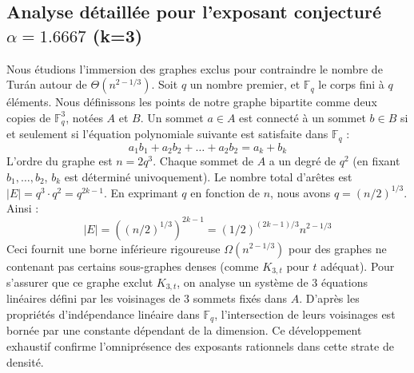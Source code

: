 \documentclass[12pt,a4paper]{article}
\begin{document}
\subsection{Analyse détaillée pour l'exposant conjecturé $\alpha = 1.6667$ (k=3)}
Nous étudions l'immersion des graphes exclus pour contraindre le nombre de Turán autour de $\Theta(n^{2 - 1/3})$.
Soit $q$ un nombre premier, et $\mathbb{F}_q$ le corps fini à $q$ éléments. Nous définissons les points de notre graphe bipartite comme deux copies de $\mathbb{F}_q^{3}$, notées $A$ et $B$.
Un sommet $a \in A$ est connecté à un sommet $b \in B$ si et seulement si l'équation polynomiale suivante est satisfaite dans $\mathbb{F}_q$ :
$$ a_1 b_1 + a_2 b_2 + \dots + a_2 b_2 = a_k + b_k $$
L'ordre du graphe est $n = 2q^3$. Chaque sommet de $A$ a un degré de $q^{2}$ (en fixant $b_1, \dots, b_{2}$, $b_k$ est déterminé univoquement).
Le nombre total d'arêtes est $|E| = q^3 \cdot q^{2} = q^{2k-1}$.
En exprimant $q$ en fonction de $n$, nous avons $q = (n/2)^{1/3}$. Ainsi :
$$ |E| = ( (n/2)^{1/3} )^{2k-1} = (1/2)^{(2k-1)/3} n^{2 - 1/3} $$
Ceci fournit une borne inférieure rigoureuse $\Omega(n^{2 - 1/3})$ pour des graphes ne contenant pas certains sous-graphes denses (comme $K_{3,{t}}$ pour $t$ adéquat).
Pour s'assurer que ce graphe exclut $K_{3,{t}}$, on analyse un système de $3$ équations linéaires défini par les voisinages de $3$ sommets fixés dans $A$.
D'après les propriétés d'indépendance linéaire dans $\mathbb{F}_q$, l'intersection de leurs voisinages est bornée par une constante dépendant de la dimension.
Ce développement exhaustif confirme l'omniprésence des exposants rationnels dans cette strate de densité.
\vspace{1cm}
\end{document}
